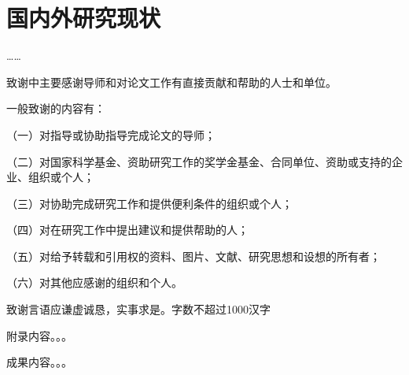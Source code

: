 \documentclass{xjtuthesis_2014_d}
\begin{document}
	\section{国内外研究现状}
	……
	
	\begin{thanks}
		致谢中主要感谢导师和对论文工作有直接贡献和帮助的人士和单位。
		
		一般致谢的内容有：
		
		（一）对指导或协助指导完成论文的导师；
		
		（二）对国家科学基金、资助研究工作的奖学金基金、合同单位、资助或支持的企业、组织或个人；
		
		（三）对协助完成研究工作和提供便利条件的组织或个人；
		
		（四）对在研究工作中提出建议和提供帮助的人；
		
		（五）对给予转载和引用权的资料、图片、文献、研究思想和设想的所有者；
		
		（六）对其他应感谢的组织和个人。
		
		致谢言语应谦虚诚恳，实事求是。字数不超过1000汉字
	\end{thanks}
	
	
	\setlength{\bibsep}{0pt}
	
	
	\begin{appendices}
		附录内容。。。
	\end{appendices}
	
	\begin{achievements}
		成果内容。。。
	\end{achievements}
	
	\declarations
	
\end{document}
